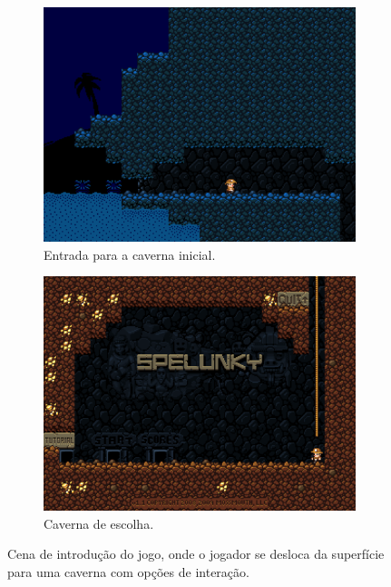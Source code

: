 \begin{figure}[H]
\centering
	\begin{subfigure}[b]{0.4\textwidth}
		\includegraphics[width=\textwidth]{fig/spelunky-intro-screen.pdf}
		\caption{Entrada para a caverna inicial.}
		\label{fig:spelunky-intro-screen}
	\end{subfigure}
	\begin{subfigure}[b]{0.4\textwidth}
		\includegraphics[width=\textwidth]{fig/spelunky-initial-screen.pdf}
		\caption{Caverna de escolha.}
		\label{fig:spelunky-initial-screen}
	\end{subfigure}

    \caption{Cena de introdução do jogo, onde o jogador se desloca da
    superfície para uma caverna com opções de interação.}
	\label{fig:spelunky-introduction}
\end{figure}

